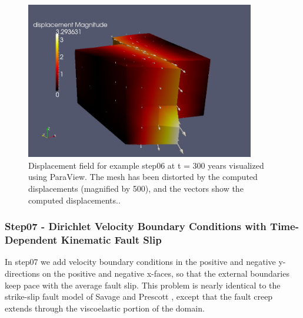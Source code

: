\begin{figure}
\centering{}\includegraphics[width=10cm]{tutorials/3dhex8/figs/step06-displ-t300}\caption{Displacement field for example step06 at t = 300 years visualized
using ParaView. The mesh has been distorted by the computed displacements
(magnified by 500), and the vectors show the computed displacements.\label{fig:step06-displ-t300}.}
\end{figure}



\subsubsection{Step07 - Dirichlet Velocity Boundary Conditions with Time-Dependent
Kinematic Fault Slip}

In step07 we add velocity boundary conditions in the positive and
negative y-directions on the positive and negative x-faces, so that
the external boundaries keep pace with the average fault slip. This
problem is nearly identical to the strike-slip fault model of Savage
and Prescott \cite{Savage:Prescott:1978}, except that the fault creep
extends through the viscoelastic portion of the domain.

